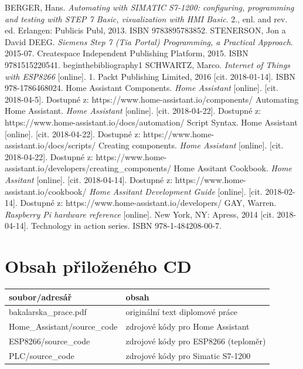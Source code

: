 \documentclass[a4paper,12pt,czech,bibliography=totoc]{scrbook}
\begin{document}
\begin{thebibliography}{99}	
BERGER, Hans. \textit{Automating with SIMATIC S7-1200: configuring, programming and testing with STEP 7 Basic, visualization with HMI Basic}. 2., enl. and rev. ed. Erlangen: Publicis Publ, 2013. ISBN 9783895783852.
STENERSON, Jon a David DEEG. \textit{Siemens Step 7 (Tia Portal) Programming, a Practical Approach}. 2015-07. Createspace Independent Publishing Platform, 2015. ISBN 9781515220541.
begin{thebibliography}{1}
SCHWARTZ, Marco. \textit{Internet of Things with ESP8266} [online]. 1. Packt Publishing Limited, 2016 [cit. 2018-01-14]. ISBN 978-1786468024.
Home Assistant Components. \textit{Home Assistant} [online]. [cit. 2018-04-5]. Dostupné z: https://www.home-assistant.io/components/
Automating Home Assistant. \textit{Home Assistant} [online]. [cit. 2018-04-22]. Dostupné z: https://www.home-assistant.io/docs/automation/
Script Syntax. Home Assistant [online]. [cit. 2018-04-22]. Dostupné z: https://www.home-assistant.io/docs/scripts/
Creating components. \textit{Home Assistant} [online]. [cit. 2018-04-22]. Dostupné z: https://www.home-assistant.io/developers/creating\_components/
Home Assitant Cookbook. \textit{Home Assitant} [online]. [cit. 2018-04-14]. Dostupné z: https://www.home-assistant.io/cookbook/
\textit{Home Assitant Development Guide} [online]. [cit. 2018-02-14]. Dostupné z: https://www.home-assistant.io/developers/
GAY, Warren. \textit{Raspberry Pi hardware reference} [online]. New York, NY: Apress, 2014 [cit. 2018-04-14]. Technology in action series. ISBN 978-1-484208-00-7.
\end{thebibliography}

\listoffigures



\appendix


\chapter{Obsah přiloženého CD}

\begin{tabular}{lp{8cm}}
  \hline
  soubor/adresář     &  obsah  \\
  \hline
  bakalarska\_prace.pdf   &   originální text diplomové práce \\
  Home\_Assistant/source\_code  & zdrojové kódy pro Home Assistant \\
  ESP8266/source\_code & zdrojové kódy pro ESP8266 (teploměr) \\
  PLC/source\_code & zdrojové kódy pro Simatic S7-1200 \\
  
  
\end{tabular}
\end{document}
